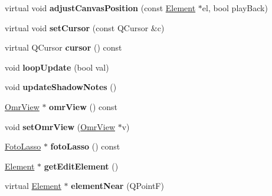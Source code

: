 \begin{DoxyCompactItemize}
virtual void {\bfseries adjust\+Canvas\+Position} (const \hyperlink{class_ms_1_1_element}{Element} $\ast$el, bool play\+Back)
\item 
\mbox{\label{class_ms_1_1_score_view_a26ebacd3526f1f98969dc242e109fad1}} 
virtual void {\bfseries set\+Cursor} (const Q\+Cursor \&c)
\item 
\mbox{\label{class_ms_1_1_score_view_a73d4b336f466da97c8ade75530300a0f}} 
virtual Q\+Cursor {\bfseries cursor} () const
\item 
\mbox{\label{class_ms_1_1_score_view_ad84962ae94d57fe7ce5db0c44b034e61}} 
void {\bfseries loop\+Update} (bool val)
\item 
\mbox{\label{class_ms_1_1_score_view_ad05366185d03cc9ab5a1faf63a1532c1}} 
void {\bfseries update\+Shadow\+Notes} ()
\item 
\mbox{\label{class_ms_1_1_score_view_a4ec233f4d5643b2ccafd668ac79715ab}} 
\hyperlink{class_ms_1_1_omr_view}{Omr\+View} $\ast$ {\bfseries omr\+View} () const
\item 
\mbox{\label{class_ms_1_1_score_view_a1134e1f03d2f2ed9304733269551d486}} 
void {\bfseries set\+Omr\+View} (\hyperlink{class_ms_1_1_omr_view}{Omr\+View} $\ast$v)
\item 
\mbox{\label{class_ms_1_1_score_view_a2e986c11a2521691529f61db6dfab1ed}} 
\hyperlink{class_ms_1_1_foto_lasso}{Foto\+Lasso} $\ast$ {\bfseries foto\+Lasso} () const
\item 
\mbox{\label{class_ms_1_1_score_view_aec10219a39113609eef0b83de814b13c}} 
\hyperlink{class_ms_1_1_element}{Element} $\ast$ {\bfseries get\+Edit\+Element} ()
\item 
\mbox{\label{class_ms_1_1_score_view_adbef3c30b425e73d82e92b56273ab1c1}} 
virtual \hyperlink{class_ms_1_1_element}{Element} $\ast$ {\bfseries element\+Near} (Q\+PointF)
\item 
\mbox{\label{class_ms_1_1_score_view_a388e8e72a1f37b851abfd426dd7ccd3d}} 

\end{DoxyCompactItemize}
